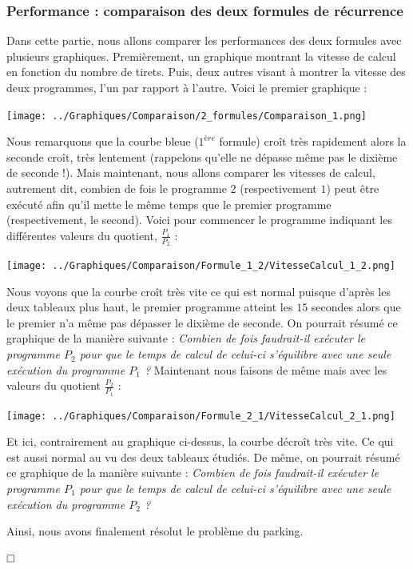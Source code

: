 \documentclass[a4paper,francais,11pt]{article}
\begin{document}
\subsubsection{Performance : comparaison des deux formules de récurrence}
Dans cette partie, nous allons comparer les performances des deux formules avec plusieurs graphiques. Premièrement, un graphique montrant la vitesse de calcul en fonction du nombre de tirets. Puis, deux autres visant à montrer la vitesse des deux programmes, l'un par rapport à l'autre. Voici le premier graphique :

\begin{center}
\texttt{[image: ../Graphiques/Comparaison/2\_formules/Comparaison\_1.png]}
\end{center}

Nous remarquons que la courbe bleue ($1^{ère}$ formule) croît très rapidement alors la seconde croît, très lentement (rappelons qu'elle ne dépasse même pas le dixième de seconde !). Mais maintenant, nous allons comparer les vitesses de calcul, autrement dit, combien de fois le programme $2$ (respectivement $1$) peut être exécuté afin qu'il mette le même temps que le premier programme (respectivement, le second). Voici pour commencer le programme indiquant les différentes valeurs du quotient, $\frac{P_1}{P_2}$ :

\begin{center}
\texttt{[image: ../Graphiques/Comparaison/Formule\_1\_2/VitesseCalcul\_1\_2.png]}
\end{center}

Nous voyons que la courbe croît très vite ce qui est normal puisque d'après les deux tableaux plus haut, le premier programme atteint les $15$ secondes alors que le premier n'a même pas dépasser le dixième de seconde. On pourrait résumé ce graphique de la manière suivante : \emph{Combien de fois faudrait-il exécuter le programme $P_2$ pour que le temps de calcul de celui-ci s'équilibre avec une seule exécution du programme $P_1$ ?} Maintenant nous faisons de même mais avec les valeurs du quotient $\frac{P_2}{P_1}$ :

\begin{center}
\texttt{[image: ../Graphiques/Comparaison/Formule\_2\_1/VitesseCalcul\_2\_1.png]}
\end{center}

Et ici, contrairement au graphique ci-dessus, la courbe décroît très vite. Ce qui est aussi normal au vu des deux tableaux étudiés. De même, on pourrait résumé ce graphique de la manière suivante : \emph{Combien de fois faudrait-il exécuter le programme $P_1$ pour que le temps de calcul de celui-ci s'équilibre avec une seule exécution du programme $P_2$ ?} 

Ainsi, nous avons finalement résolut le problème du parking. 

$\claim$
\end{document}
